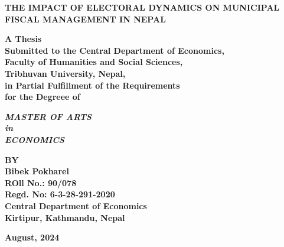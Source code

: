 \begin{titlepage}
   \begin{center}
        \vspace*{-1cm}
        \begin{center}
        \textbf{THE IMPACT OF ELECTORAL DYNAMICS ON MUNICIPAL\\ FISCAL MANAGEMENT IN NEPAL}
    	\end{center}
        \vspace{3.5cm}
        
        \textbf{\large {A Thesis}} \\
        
        \textbf{Submitted to the 
        Central Department of Economics, \\
        Faculty of Humanities and Social Sciences, \\
        Tribhuvan University, Nepal,\\
        in Partial Fulfillment of the Requirements\\
        for the Degreee of}
        
        \vspace{3.5cm}
        
    
        \textbf{\emph{MASTER OF ARTS} \\
        \emph{in} \\
        \emph{ECONOMICS}}        
        \vspace{3.5cm}
        
        \textbf{BY \\
        Bibek Pokharel \\
        ROll No.: 90/078 \\
        Regd. No: 6-3-28-291-2020}   \\     
        \textbf{Central Department of Economics \\
        Kirtipur, Kathmandu, Nepal}
        
        \vspace{2.5cm}
        
        \textbf{August, 2024}
        
    \end{center}
\end{titlepage}


\renewcommand{\contentsname}{Table of Contents} %






\newpage

